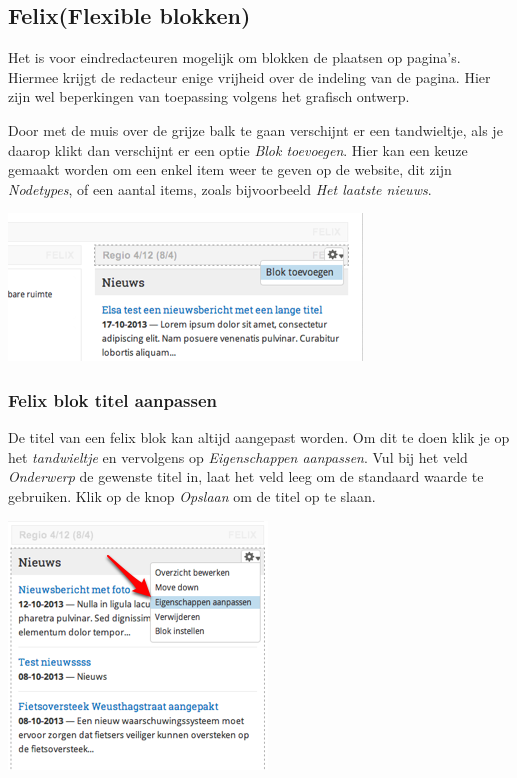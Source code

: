 
\subsection{Felix(Flexible blokken)}\label{felix}
Het is voor eindredacteuren mogelijk om blokken de plaatsen op pagina's. Hiermee krijgt de redacteur enige vrijheid over de indeling van de pagina. Hier zijn wel beperkingen van toepassing volgens het grafisch ontwerp.

Door met de muis over de grijze balk te gaan verschijnt er een tandwieltje, als je daarop klikt dan verschijnt er een optie \emph{Blok toevoegen}. Hier kan een keuze gemaakt worden om een enkel item weer te geven op de website, dit zijn \emph{Nodetypes}, of een aantal items, zoals bijvoorbeeld \emph{Het laatste nieuws}.

\begin{center}
	\includegraphics[width=\textwidth]{img/felix.png}
\end{center}

\subsubsection{Felix blok titel aanpassen}\label{felixbloktitel}

De titel van een felix blok kan altijd aangepast worden. Om dit te doen klik je op het \emph{tandwieltje} en vervolgens op \emph{Eigenschappen aanpassen}. Vul bij het veld \emph{Onderwerp} de gewenste titel in, laat het veld leeg om de standaard waarde te gebruiken. Klik op de knop \emph{Opslaan} om de titel op te slaan. 

\begin{center}
	\includegraphics[scale=1.0]{img/felix0.png}
\end{center}

